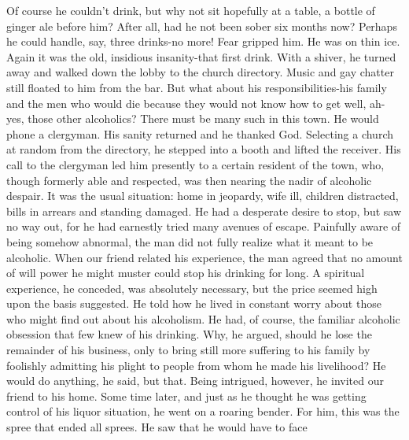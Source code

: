 \begin{biblechapter}
Of course he couldn't drink, but why not sit hopefully at a table, a bottle of ginger ale before him?  After all, had he not been sober six months now?  Perhaps he could handle, say, three drinks-no more!  Fear gripped him.  He was on thin ice.  Again it was the old, insidious insanity-that first drink.  With a shiver, he turned away and walked down the lobby to the church directory.  Music and gay chatter still floated to him from the bar.
But what about his responsibilities-his family and the men who would die because they would not know how to get well, ah-yes, those other alcoholics?  There must be many such in this town.  He would phone a clergyman.  His sanity returned and he thanked God.  Selecting a church at random from the directory, he stepped into a booth and lifted the receiver.
His call to the clergyman led him presently to a certain resident of the town, who, though formerly able and respected, was then nearing the nadir of alcoholic despair.  It was the usual situation: home in jeopardy, wife ill, children distracted, bills in arrears and standing damaged.  He had a desperate desire to stop, but saw no way out, for he had earnestly tried many avenues of escape.  Painfully aware of being somehow abnormal, the man did not fully realize what it meant to be alcoholic.
When our friend related his experience, the man agreed that no amount of will power he might muster could stop his drinking for long.  A spiritual experience, he conceded, was absolutely necessary, but the price seemed high upon the basis suggested.  He told how he lived in constant worry about those who might find out about his alcoholism.  He had, of course, the familiar alcoholic obsession that few knew of his drinking.  Why, he argued, should he lose the remainder of his business, only to bring still more suffering to his family by foolishly admitting his plight to people from whom he made his livelihood?  He would do anything, he said, but that.
Being intrigued, however, he invited our friend to his home.  Some time later, and just as he thought  he was getting control of his liquor situation, he went on a roaring bender.  For him, this was the spree that ended all sprees.  He saw that he would have to face


\end{biblechapter}
